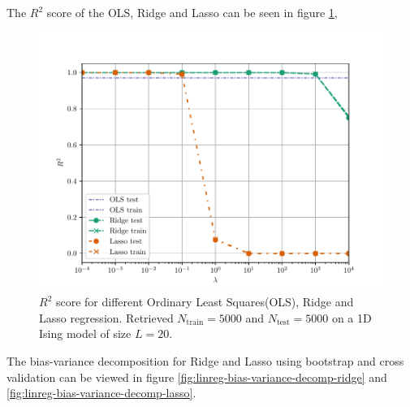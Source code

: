The $R^2$ score of the OLS, Ridge and Lasso can be seen in figure \ref{fig:linreg-r2},
\begin{figure}[H]
    \centering
    \includegraphics[scale=1.0]{../fig/r2_ols_ridge_lasso.pdf}
    \caption{$R^2$ score for different Ordinary Least Squares(OLS), Ridge and Lasso regression. Retrieved $N_\mathrm{train}=5000$ and $N_\mathrm{test}=5000$ on a 1D Ising model of size $L=20$.}
    \label{fig:linreg-r2}
\end{figure}

The bias-variance decomposition for Ridge and Lasso using bootstrap and cross validation can be viewed in figure \ref{fig:linreg-bias-variance-decomp-ridge} and \ref{fig:linreg-bias-variance-decomp-lasso}.

